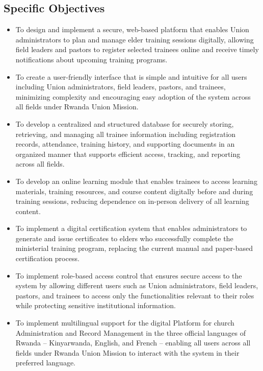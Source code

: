 \documentclass[12pt]{report}
\begin{document}
\subsection{Specific Objectives}
\begin{itemize}
    \item To design and implement a secure, web-based platform that enables Union administrators to plan and manage elder training sessions digitally, allowing field leaders and pastors to register selected trainees online and receive timely notifications about upcoming training programs.
    \item To create a user-friendly interface that is simple and intuitive for all users including Union administrators, field leaders, pastors, and trainees, minimizing complexity and encouraging easy adoption of the system across all fields under Rwanda Union Mission.
    \item To develop a centralized and structured database for securely storing, retrieving, and managing all trainee information including registration records, attendance, training history, and supporting documents in an organized manner that supports efficient access, tracking, and reporting across all fields.
    \item To develop an online learning module that enables trainees to access learning materials, training resources, and course content digitally before and during training sessions, reducing dependence on in-person delivery of all learning content.
    \item To implement a digital certification system that enables administrators to generate and issue certificates to elders who successfully complete the ministerial training program, replacing the current manual and paper-based certification process.
    \item To implement role-based access control that ensures secure access to the system by allowing different users such as Union administrators, field leaders, pastors, and trainees to access only the functionalities relevant to their roles while protecting sensitive institutional information.
    \item To implement multilingual support for the digital Platform for church Administration and Record Management in the three official languages of Rwanda – Kinyarwanda, English, and French – enabling all users across all fields under Rwanda Union Mission to interact with the system in their preferred language.
\end{itemize}
\end{document}
